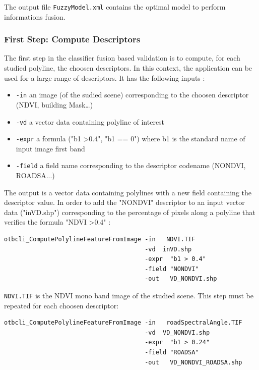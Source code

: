 The output file \verb?FuzzyModel.xml? contains the optimal model to perform 
informations fusion.

\subsubsection{First Step: Compute Descriptors}

The first step in the classifier fusion based validation is to compute, for 
each studied polyline, the choosen descriptors. In this context, the 
 application can be used for a 
large range of descriptors. It has the following inputs :
\begin{itemize}
\item \verb?-in? an image (of the sudied scene) corresponding to the choosen 
descriptor (NDVI, building Mask\dots)
\item \verb?-vd? a vector data containing polyline of interest
\item \verb?-expr? a formula ("b1 \textgreater 0.4", "b1 == 0") where b1 is 
the standard name of input image first band
\item \verb?-field? a field name corresponding to the descriptor codename 
(NONDVI, ROADSA...)
\end{itemize}

The output is a vector data containing polylines with a new field containing 
the descriptor value. In order to add the "NONDVI" descriptor to an input 
vector data ("inVD.shp") corresponding to the percentage of pixels along a 
polyline that verifies the formula "NDVI \textgreater 0.4" :

\begin{verbatim}
otbcli_ComputePolylineFeatureFromImage -in   NDVI.TIF 
                                       -vd  inVD.shp 
                                       -expr  "b1 > 0.4" 
                                       -field "NONDVI" 
                                       -out   VD_NONDVI.shp
\end{verbatim}

\verb?NDVI.TIF? is the NDVI mono band image of the studied scene.
This step must be repeated for each choosen descriptor:

\begin{verbatim}
otbcli_ComputePolylineFeatureFromImage -in   roadSpectralAngle.TIF  
                                       -vd  VD_NONDVI.shp 
                                       -expr  "b1 > 0.24"
                                       -field "ROADSA" 
                                       -out   VD_NONDVI_ROADSA.shp
\end{verbatim}

